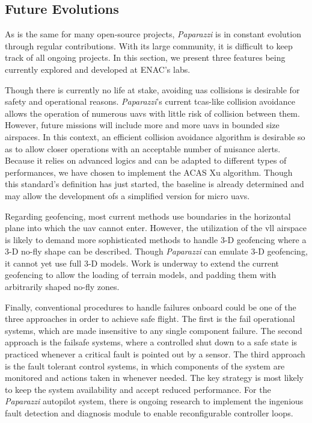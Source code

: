 \subsection{Future Evolutions}
	As is the same for many open-source projects, \emph{Paparazzi} is in constant evolution through regular contributions. With its large community, it is difficult to keep track of all ongoing projects. In this section, we present three features being currently explored and developed at ENAC's labs. 

	Though there is currently no life at stake, avoiding \gls{uas} collisions is desirable for safety and operational reasons. 
	 \emph{Paparazzi}'s current \gls{tcas}-like collision avoidance allows the operation of numerous \gls{uav}s with little risk of collision between them. However, future missions will include more and more \gls{uav}s in bounded size airspaces.
	 In this context, an efficient collision avoidance algorithm is desirable so as to allow closer operations with an acceptable number of nuisance alerts. 
	 Because it relies on advanced logics and can be adapted to different types of performances, we have chosen to implement the ACAS Xu algorithm. Though this standard's definition has just started, the baseline is already determined and may allow the development ofs a simplified version for micro \gls{uav}s. 

	Regarding geofencing, most current methods use boundaries in the horizontal plane into which the \gls{uav} cannot enter. However, the utilization of the \gls{vll} airspace is likely to demand more sophisticated methods to handle 3-D geofencing where a 3-D no-fly shape can be described.
	Though \emph{Paparazzi} can emulate 3-D geofencing, it cannot yet use full 3-D models. Work is underway to extend the current geofencing to allow the loading of terrain models, and padding them with arbitrarily shaped no-fly zones.

	Finally, conventional procedures to handle failures onboard could be one of the three approaches in order to achieve safe flight. The first is the fail operational systems, which are made insensitive to any single component failure. The second approach is the failsafe systems, where a controlled shut down to a safe state is practiced whenever a critical fault is pointed out by a sensor. The third approach is the fault tolerant control systems, in which components of the system are monitored and actions taken in whenever needed. The key strategy is most likely to keep the system availability and accept reduced performance. For the \emph{Paparazzi} autopilot system, there is ongoing research to implement the ingenious fault detection and diagnosis module to enable reconfigurable controller loops. 
	
